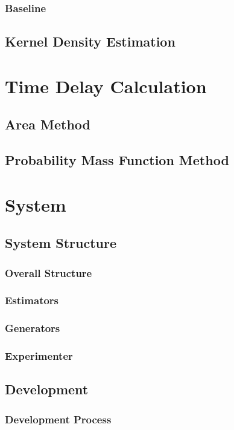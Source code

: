 \documentclass[a4paper,12pt]{article}
\begin{document}
\subsubsection{Baseline}
\label{sec-4-1-4}
\subsection{Kernel Density Estimation}
\label{sec-4-2}
\section{Time Delay Calculation}
\label{sec-5}
\subsection{Area Method}
\label{sec-5-1}
\subsection{Probability Mass Function Method}
\label{sec-5-2}
\section{System}
\label{sec-6}
\subsection{System Structure}
\label{sec-6-1}
\subsubsection{Overall Structure}
\label{sec-6-1-1}
\subsubsection{Estimators}
\label{sec-6-1-2}
\subsubsection{Generators}
\label{sec-6-1-3}
\subsubsection{Experimenter}
\label{sec-6-1-4}
\subsection{Development}
\label{sec-6-2}
\subsubsection{Development Process}
\label{sec-6-2-1}
\end{document}
